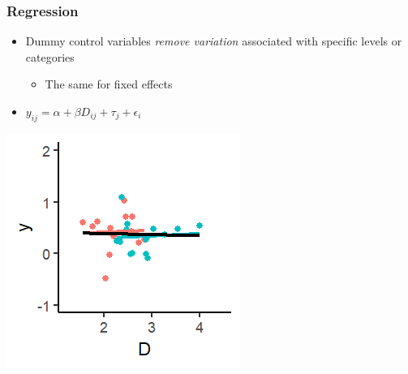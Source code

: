 \documentclass[xcolor=x11names,compress]{beamer}\usepackage[]{graphicx}\usepackage[]{color}
\makeatletter
\def\maxwidth{ %
  \ifdim\Gin@nat@width>\linewidth
    \linewidth
  \else
    \Gin@nat@width
  \fi
}
\newenvironment{knitrout}{}{} %
\renewcommand{\(}{\begin{columns}}
\renewcommand{\)}{\end{columns}}
\newcommand{\<}[1]{\begin{column}{#1}}
\renewcommand{\>}{\end{column}}
\makeatother
\begin{document}
\begin{frame}
\frametitle{Regression}
\begin{itemize}
\item Dummy control variables \textit{remove variation} associated with specific levels or categories
\begin{itemize}
\item The same for fixed effects
\end{itemize}
\item $y_{ij} = \alpha + \beta D_{ij} + \tau_j + \epsilon_i$
\end{itemize}
\begin{multicols}{2}
\begin{knitrout}
\color{fgcolor}
\includegraphics[width=\maxwidth]{figure/graph_ols_FE5-1} 

\end{knitrout}
\columnbreak
\end{multicols}
\end{frame}
\end{document}
